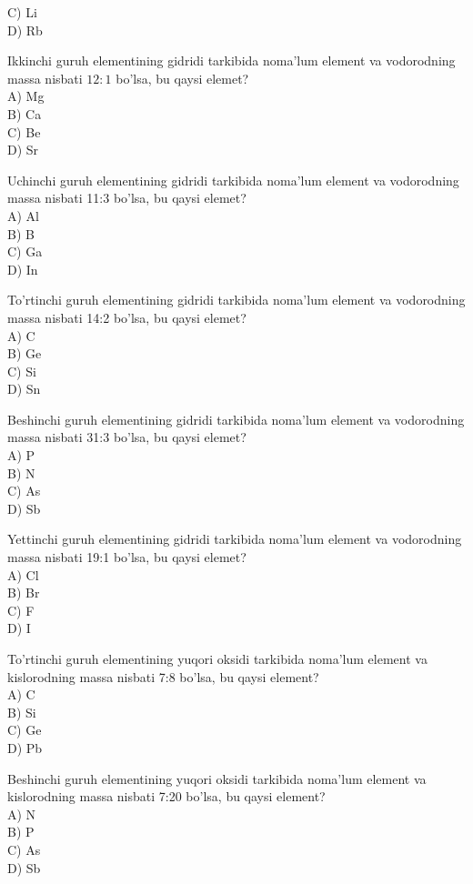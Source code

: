 C) Li\\
D) Rb
  \item Ikkinchi guruh elementining gidridi tarkibida noma'lum element va vodorodning massa nisbati $12: 1$ bo'lsa, bu qaysi elemet?\\
A) Mg\\
B) Ca\\
C) Be\\
D) Sr
  \item Uchinchi guruh elementining gidridi tarkibida noma'lum element va vodorodning massa nisbati 11:3 bo'lsa, bu qaysi elemet?\\
A) Al\\
B) B\\
C) Ga\\
D) In
  \item To'rtinchi guruh elementining gidridi tarkibida noma'lum element va vodorodning massa nisbati 14:2 bo'lsa, bu qaysi elemet?\\
A) C\\
B) Ge\\
C) Si\\
D) Sn
  \item Beshinchi guruh elementining gidridi tarkibida noma'lum element va vodorodning massa nisbati 31:3 bo'lsa, bu qaysi elemet?\\
A) P\\
B) N\\
C) As\\
D) Sb
  \item Yettinchi guruh elementining gidridi tarkibida noma'lum element va vodorodning massa nisbati 19:1 bo'lsa, bu qaysi elemet?\\
A) Cl\\
B) Br\\
C) F\\
D) I
  \item To'rtinchi guruh elementining yuqori oksidi tarkibida noma'lum element va kislorodning massa nisbati 7:8 bo'lsa, bu qaysi element?\\
A) C\\
B) Si\\
C) Ge\\
D) Pb
  \item Beshinchi guruh elementining yuqori oksidi tarkibida noma'lum element va kislorodning massa nisbati 7:20 bo'lsa, bu qaysi element?\\
A) N\\
B) P\\
C) As\\
D) Sb
